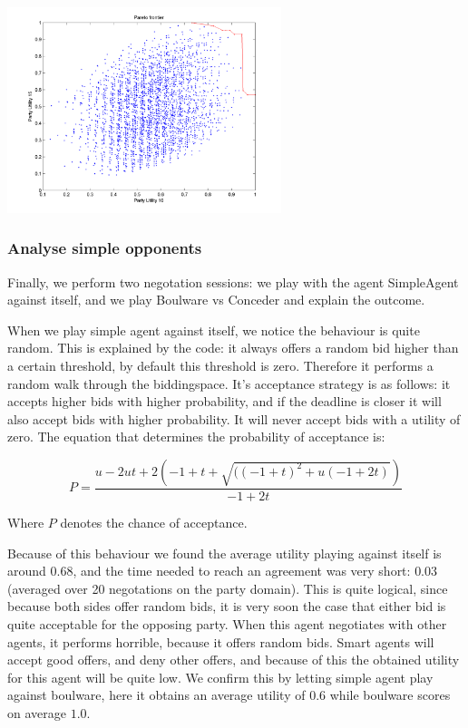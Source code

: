 \documentclass[a4paper,10pt]{article}
\begin{document}
\begin{center}
 \includegraphics[width=0.6\textwidth]{pareto.png}
\end{center}

\subsubsection{Analyse simple opponents}

Finally, we perform two negotation sessions: we play with the agent SimpleAgent against
itself, and we play Boulware vs Conceder and explain the outcome. 

When we play simple agent against itself, we notice the behaviour is quite random.
This is explained by the code: it always offers a random bid higher than a certain threshold,
by default this threshold is zero. Therefore it performs a random walk through the 
biddingspace. It's acceptance strategy is as follows: it accepts higher bids with 
higher probability, and if the deadline is closer it will also accept bids with higher probability.
It will never accept bids with a utility of zero. The equation that determines the 
probability of acceptance is:

\begin{equation}
P = \frac{u - 2ut + 2(-1 + t + \sqrt{((-1 + t)^2 + u(-1 + 2t)})}{-1 + 2t}
\end{equation}

Where $P$ denotes the chance of acceptance.

Because of this behaviour 
we found the average utility playing against itself is around $0.68$, and the
time needed to reach an agreement was very short: $0.03$ (averaged
over 20 negotations on the party domain).
This is quite logical, since because both sides offer random bids, it is very soon the
case that either bid is quite acceptable for the opposing party.
When this agent negotiates with other agents, it performs horrible, because
it offers random bids. Smart agents will accept good offers, and deny other offers,
and because of this the obtained utility for this agent will be quite low.
We confirm this by letting simple agent play against boulware, here it obtains 
an average utility of $0.6$ while boulware scores on average $1.0$.
\end{document}
